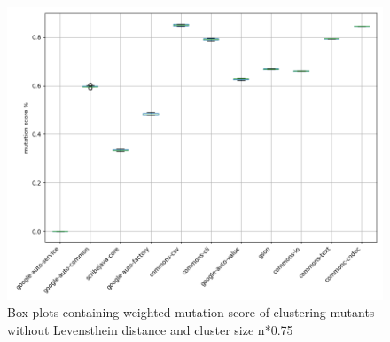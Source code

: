 \documentclass[conference,draftclsnofoot,onecolumn]{IEEEtran}
\begin{document}
\begin{figure}[ht]
\includegraphics[width=0.5 \textwidth]{images/boxplot_summary/boxplot_hc_no_distance_0.75.png}
\caption{\label{box:clustering_no_distance_75}Box-plots containing weighted mutation score of clustering mutants without Levensthein distance and cluster size n*0.75}
\end{figure}
\end{document}
